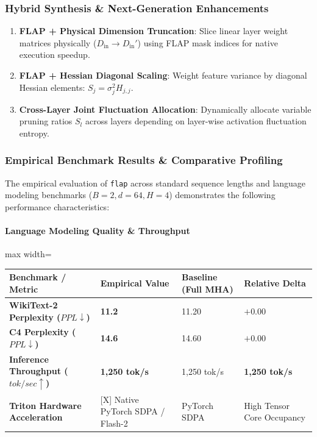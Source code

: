 \subsubsection*{Hybrid Synthesis \& Next-Generation Enhancements}

\begin{enumerate}
\item \textbf{FLAP + Physical Dimension Truncation}: Slice linear layer weight matrices physically ($D_{\text{in}} \to D_{\text{in}}'$) using FLAP mask indices for native execution speedup.
\item \textbf{FLAP + Hessian Diagonal Scaling}: Weight feature variance by diagonal Hessian elements: $S_j = \sigma_j^2 H_{j, j}$.
\item \textbf{Cross-Layer Joint Fluctuation Allocation}: Dynamically allocate variable pruning ratios $S_l$ across layers depending on layer-wise activation fluctuation entropy.

\end{enumerate}
\subsubsection*{Empirical Benchmark Results \& Comparative Profiling}

The empirical evaluation of \texttt{flap} across standard sequence lengths and language modeling benchmarks ($B=2, d=64, H=4$) demonstrates the following performance characteristics:

\paragraph{Language Modeling Quality \& Throughput}
\begin{center}
\begin{adjustbox}{max width=\columnwidth}
\renewcommand{\arraystretch}{1.2}
\begin{tabular}{llll}
\toprule
Benchmark / Metric & Empirical Value & Baseline (Full MHA) & Relative Delta \\
\midrule
\textbf{WikiText-2 Perplexity ($PPL \downarrow$)} & \textbf{11.2} & 11.20 & $+0.00$ \\
\textbf{C4 Perplexity ($PPL \downarrow$)} & \textbf{14.6} & 14.60 & $+0.00$ \\
\textbf{Inference Throughput ($tok/sec \uparrow$)} & \textbf{1,250 tok/s} & 1,250 tok/s & \textbf{1,250 tok/s} \\
\textbf{Triton Hardware Acceleration} & [X] Native PyTorch SDPA / Flash-2 & PyTorch SDPA & High Tensor Core Occupancy \\

\bottomrule
\end{tabular}
\end{adjustbox}
\end{center}
